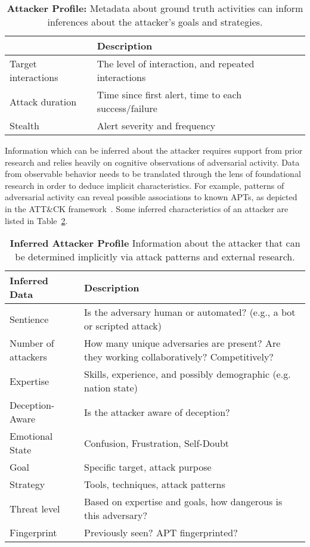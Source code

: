 \documentclass{article}
\begin{document}
\bgroup
\def\arraystretch{1.5}
\begin{table}[!htb] \small
	\begin{tabular}{ | p{} | p{} | }
		\hline
		\cellcolor{ltgray}\thead[l]{Characteristic} & \cellcolor{ltgray}Description\\ \hline
		Target interactions & The level of interaction, and repeated interactions \\ \hline
		Attack duration & Time since first alert, time to each success/failure \\ \hline
		Stealth & Alert severity and frequency	 \\ \hline
	\end{tabular}
	\caption{\textbf{Attacker Profile:} Metadata about ground truth activities can inform inferences about the attacker's goals and strategies.} 
	\label{table:profile_known}
\end{table}
\egroup


Information which can be inferred about the attacker requires support from prior research and relies heavily on cognitive observations of adversarial activity\cite{Abbasi2000}\cite{gutzwiller_oh_2018}. Data from observable behavior needs to be translated through the lens of foundational research in order to deduce implicit characteristics. For example, patterns of adversarial activity can reveal possible associations to known APTs, as depicted in the ATT\&CK framework~\cite{mitre_attck}. Some inferred characteristics of an attacker are listed in Table~\ref{table:profile_inferred}.

\bgroup
\def\arraystretch{1.5}
\begin{table}[!htb] \small
	\begin{tabular}{ | p{} | p{} | }
		\hline
		\cellcolor{ltgray}Inferred Data & \cellcolor{ltgray}Description\\ \hline
		Sentience & Is the adversary human or automated? (e.g., a bot or scripted attack) 	 \\ \hline
		Number of attackers & How many unique adversaries are present? Are they working collaboratively? Competitively? \\ \hline
		Expertise & Skills, experience, and possibly demographic (e.g. nation state)	 \\ \hline
		Deception-Aware & Is the attacker aware of deception? \\ \hline
		Emotional State & Confusion, Frustration, Self-Doubt \\ \hline
		Goal & Specific target, attack purpose 	 \\ \hline
		Strategy & Tools, techniques, attack patterns	 \\ \hline
		Threat level & Based on expertise and goals, how dangerous is this adversary? \\ \hline
		Fingerprint & Previously seen? APT fingerprinted? 	 \\ \hline
	\end{tabular}
	\caption{\textbf{Inferred Attacker Profile} Information about the attacker that can be determined implicitly via attack patterns and external research.} 
	\label{table:profile_inferred}
\end{table}
\egroup
\end{document}
